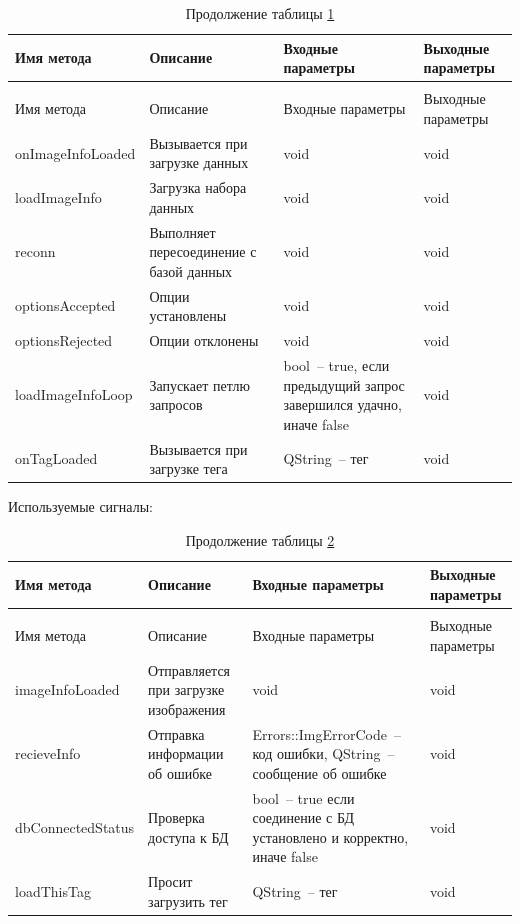 \documentclass[a4paper,14pt,russian]{extreport}
\begin{document}
\begin{longtable}{|m{3 cm}|m{3 cm}|m{4 cm}|m{4 cm}|}
\caption{Слоты класса DataModel\label{tab:datamodelsl}} \\
\hline 
Имя метода & Описание & Входные параметры & Выходные параметры \\
\hline
\endfirsthead
\caption*{Продолжение таблицы \ref{tab:datamodelsl}} \\
\hline
Имя метода & Описание & Входные параметры & Выходные параметры \\
\endhead
{on\-Image\-Info\-Loaded} & Вызывается при загрузке данных & void & void \\
\hline
{load\-Image\-Info} & Загрузка набора данных & void & void \\
\hline
reconn & Выполняет пересоединение с базой данных & void & void \\
\hline
{options\-Accepted} & Опции установлены & void & void \\
\hline
{options\-Rejected} & Опции отклонены & void & void \\
\hline
{load\-Image\-Info\-Loop} & Запускает петлю запросов & bool~-- true, если предыдущий запрос завершился удачно, иначе false & void \\
\hline
{on\-Tag\-Loaded} & Вызывается при загрузке тега & QString~-- тег & void \\
\hline
\end{longtable}

Используемые сигналы:

\begin{longtable}{|m{3 cm}|m{3 cm}|m{4 cm}|m{4 cm}|}
\caption{Сигналы класса DataModel\label{tab:datamodelsig}} \\
\hline 
Имя метода & Описание & Входные параметры & Выходные параметры \\
\hline
\endfirsthead
\caption*{Продолжение таблицы \ref{tab:datamodelsig}} \\
\hline
Имя метода & Описание & Входные параметры & Выходные параметры \\
\endhead
{image\-Info\-Loaded} & Отправляется при загрузке изображения & void & void \\
\hline
{recieve\-Info} & Отправка информации об ошибке & {Errors::Img\-Error\-Code}~-- код ошибки, QString~-- сообщение об ошибке & void \\
\hline
{db\-Connected\-Status} & Проверка доступа к БД & bool~-- true если соединение с БД установлено и корректно, иначе false & void \\
\hline
{load\-This\-Tag} & Просит загрузить тег & QString~-- тег & void \\
\hline
\end{longtable}
\end{document}
